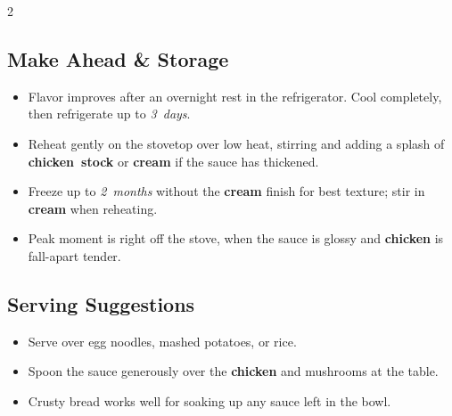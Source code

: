 \documentclass[11pt,letterpaper]{article}
\begin{document}
{\begin{multicols}{2}
\subsection*{Make Ahead \& Storage}
\begin{itemize}
    \item Flavor improves after an overnight rest in the refrigerator. Cool completely, then refrigerate up to \textit{3~days}.
    \item Reheat gently on the stovetop over low heat, stirring and adding a splash of \textbf{chicken~stock} or \textbf{cream} if the sauce has thickened.
    \item Freeze up to \textit{2~months} without the \textbf{cream} finish for best texture; stir in \textbf{cream} when reheating.
    \item Peak moment is right off the stove, when the sauce is glossy and \textbf{chicken} is fall-apart tender.
\end{itemize}

\subsection*{Serving Suggestions}
\begin{itemize}
    \item Serve over egg noodles, mashed potatoes, or rice.
    \item Spoon the sauce generously over the \textbf{chicken} and mushrooms at the table.
    \item Crusty bread works well for soaking up any sauce left in the bowl.
\end{itemize}

\end{multicols}
}
\end{document}
